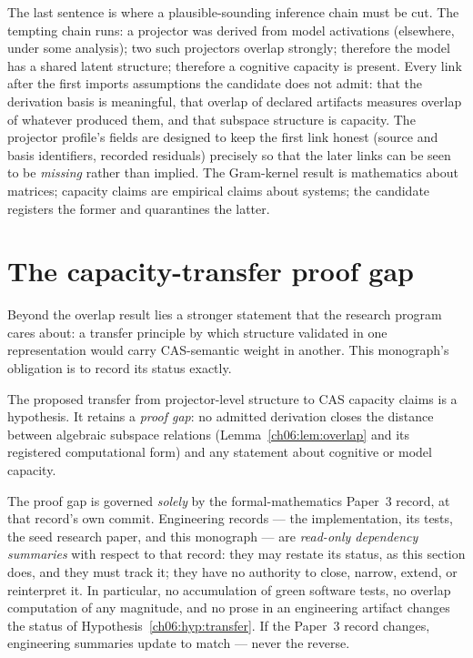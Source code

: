 The last sentence is where a plausible-sounding inference chain must
be cut. The tempting chain
runs: a projector was derived from model activations (elsewhere, under
some analysis); two such projectors overlap strongly; therefore the
model has a shared latent structure; therefore a cognitive capacity is
present. Every link after the first imports assumptions the candidate
does not admit: that the derivation basis is meaningful, that overlap
of declared artifacts measures overlap of whatever produced them, and
that subspace structure is capacity. The projector profile's fields are
designed to keep the first link honest (source and basis identifiers,
recorded residuals) precisely so that the later links can be seen to be
\emph{missing} rather than implied. The Gram-kernel result is
mathematics about matrices; capacity claims are empirical claims about
systems; the candidate registers the former and quarantines the latter.

\section{The capacity-transfer proof gap}\label{ch06:sec:proofgap}

Beyond the overlap result lies a stronger statement that the research
program cares about: a transfer principle by which structure validated
in one representation would carry CAS-semantic weight in another.
This monograph's obligation is to record its status exactly.

\begin{hypothesis}
\label{ch06:hyp:transfer}
The proposed transfer from projector-level structure to CAS capacity
claims is a hypothesis. It retains a \emph{proof gap}: no admitted
derivation closes the distance between algebraic subspace relations
(Lemma~\ref{ch06:lem:overlap} and its registered computational form)
and any statement about cognitive or model capacity.
\end{hypothesis}

\begin{ruleenv}\label{ch06:rule:papergov}
The proof gap is governed \emph{solely} by the formal-mathematics
Paper~3 record, at that record's own commit. Engineering records ---
the implementation, its tests, the seed research paper, and this
monograph --- are \emph{read-only dependency summaries} with respect to
that record: they may restate its status, as this section does, and
they must track it; they have no authority to close, narrow, extend, or
reinterpret it. In particular, no accumulation of green software tests,
no overlap computation of any magnitude, and no prose in an engineering
artifact changes the status of Hypothesis~\ref{ch06:hyp:transfer}. If
the Paper~3 record changes, engineering summaries update to match ---
never the reverse.
\end{ruleenv}

